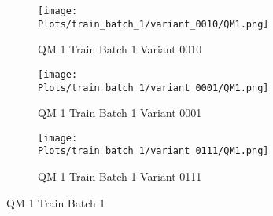 \documentclass{DissertateFigs}
\begin{document}
\begin{figure}[t!]
\medskip

    \begin{subfigure}{0.47\textwidth}
    \texttt{[image: Plots/train\_batch\_1/variant\_0010/QM1.png]}
    \caption{QM 1 Train Batch 1 Variant 0010}
    \end{subfigure}
    \begin{subfigure}{0.47\textwidth}
    \texttt{[image: Plots/train\_batch\_1/variant\_0001/QM1.png]}
    \caption{QM 1 Train Batch 1 Variant 0001}
    \end{subfigure}

\medskip

    \begin{subfigure}{0.47\textwidth}
    \texttt{[image: Plots/train\_batch\_1/variant\_0111/QM1.png]}
    \caption{QM 1 Train Batch 1 Variant 0111}
    \end{subfigure}
\caption{QM 1 Train Batch 1}
    \end{figure}
\clearpage
\end{document}
